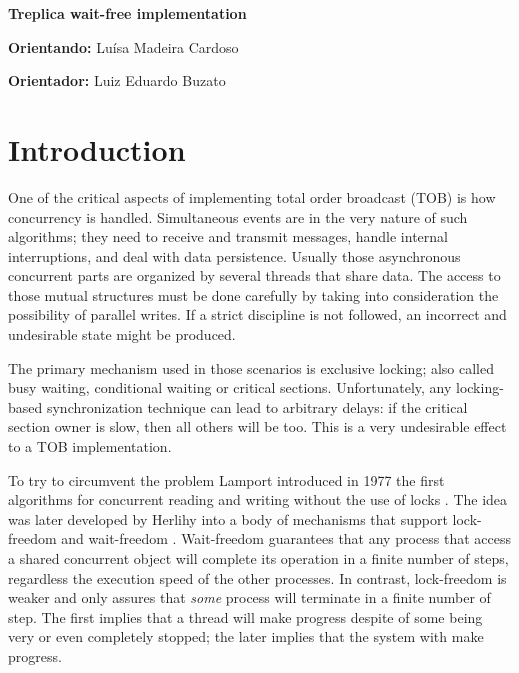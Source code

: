 \documentclass[12pt,twoside,a4paper]{article}
\begin{document}
\vskip 15mm

\begin{center} 
\textbf{Treplica wait-free implementation}
\end{center}

\vskip 5mm

\textbf{Orientando:} Luísa Madeira Cardoso

\textbf{Orientador:} Luiz Eduardo Buzato 

\vskip 20mm

\begin{abstract}

\end{abstract}

\newpage
\pagestyle{plain}
\headheight 0.0cm
\headsep 0.0cm
\footskip 2.2cm

\section{Introduction}
One of the critical aspects of implementing total order broadcast (TOB) is how 
concurrency is handled. Simultaneous events are in the very nature of such 
algorithms; they need to receive and transmit messages, handle internal 
interruptions, and deal with data persistence. Usually those asynchronous 
concurrent parts are organized by several threads that share data. The access to 
those mutual structures must be done carefully by taking into consideration the 
possibility of parallel writes. If a strict discipline is not followed, an 
incorrect and undesirable state might be produced. 

The primary mechanism used in those scenarios is exclusive locking; also called 
busy waiting, conditional waiting or critical sections. Unfortunately, any 
locking-based synchronization technique can lead  to arbitrary delays: if the 
critical section owner is slow, then all others will be too. This is a very 
undesirable effect to a TOB implementation. 

To try to circumvent the problem Lamport introduced in 1977 the first algorithms 
for concurrent reading and writing without the use of locks \cite{lamport77b}. 
The idea was later developed by Herlihy into a body of mechanisms that support 
lock-freedom and wait-freedom \cite{herlihy1990methodology}. Wait-freedom 
guarantees that any process that access a shared concurrent  object will 
complete its operation in a finite number of steps, regardless  the execution 
speed of the other processes. In contrast, lock-freedom is weaker and only 
assures that \textit{some} process will terminate in a finite number of step. 
The first implies that a thread will make progress despite of some being very or 
even completely stopped; the later implies that the system with make progress. 
\end{document}
